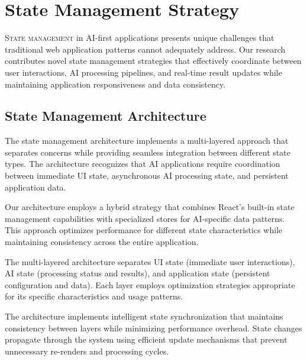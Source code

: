 
\section*{State Management Strategy}

\lettrine{S}{tate management} in AI-first applications presents unique challenges that traditional web application patterns cannot adequately address. Our research contributes novel state management strategies that effectively coordinate between user interactions, AI processing pipelines, and real-time result updates while maintaining application responsiveness and data consistency.

\subsection*{State Management Architecture}

The state management architecture implements a multi-layered approach that separates concerns while providing seamless integration between different state types. The architecture recognizes that AI applications require coordination between immediate UI state, asynchronous AI processing state, and persistent application data.

Our architecture employs a hybrid strategy that combines React's built-in state management capabilities with specialized stores for AI-specific data patterns. This approach optimizes performance for different state characteristics while maintaining consistency across the entire application.

\begin{infobox}[title=State Architecture Layers]
The multi-layered architecture separates UI state (immediate user interactions), AI state (processing status and results), and application state (persistent configuration and data). Each layer employs optimization strategies appropriate for its specific characteristics and usage patterns.
\end{infobox}

The architecture implements intelligent state synchronization that maintains consistency between layers while minimizing performance overhead. State changes propagate through the system using efficient update mechanisms that prevent unnecessary re-renders and processing cycles.

